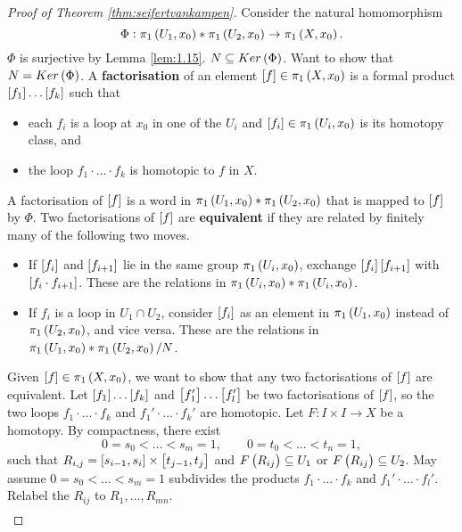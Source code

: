 \begin{proof}[Proof of Theorem \ref{thm:seifertvankampen}]
Consider the natural homomorphism
$$ \Phi : \pi_1\br{U_1, x_0} * \pi_1\br{U_2, x_0} \to \pi_1\br{X, x_0}. $$
$ \Phi $ is surjective by Lemma \ref{lem:1.15}. $ N \subseteq Ker\br{\Phi} $. Want to show that $ N = Ker\br{\Phi} $. A \textbf{factorisation} of an element $ \sbr{f} \in \pi_1\br{X, x_0} $ is a formal product $ \sbr{f_1} \dots \sbr{f_k} $ such that
\begin{itemize}
\item each $ f_i $ is a loop at $ x_0 $ in one of the $ U_i $ and $ \sbr{f_i} \in \pi_1\br{U_i, x_0} $ is its homotopy class, and
\item the loop $ f_1 \cdot \dots \cdot f_k $ is homotopic to $ f $ in $ X $.
\end{itemize}
A factorisation of $ \sbr{f} $ is a word in $ \pi_1\br{U_1, x_0} * \pi_1\br{U_2, x_0} $ that is mapped to $ \sbr{f} $ by $ \Phi $. Two factorisations of $ \sbr{f} $ are \textbf{equivalent} if they are related by finitely many of the following two moves.
\begin{itemize}
\item If $ \sbr{f_i} $ and $ \sbr{f_{i + 1}} $ lie in the same group $ \pi_1\br{U_i, x_0} $, exchange $ \sbr{f_i}\sbr{f_{i + 1}} $ with $ \sbr{f_i \cdot f_{i + 1}} $. These are the relations in $ \pi_1\br{U_i, x_0} * \pi_1\br{U_i, x_0} $.
\item If $ f_i $ is a loop in $ U_1 \cap U_2 $, consider $ \sbr{f_i} $ as an element in $ \pi_1\br{U_1, x_0} $ instead of $ \pi_1\br{U_2, x_0} $, and vice versa. These are the relations in $ \pi_1\br{U_1, x_0} * \pi_1\br{U_2, x_0} / N $.
\end{itemize}
Given $ \sbr{f} \in \pi_1\br{X, x_0} $, we want to show that any two factorisations of $ \sbr{f} $ are equivalent. Let $ \sbr{f_1} \dots \sbr{f_k} $ and $ \sbr{f_1'} \dots \sbr{f_l'} $ be two factorisations of $ \sbr{f} $, so the two loops $ f_1 \cdot \dots \cdot f_k $ and $ f_1' \cdot \dots \cdot f_k' $ are homotopic. Let $ F : I \times I \to X $ be a homotopy. By compactness, there exist
$$ 0 = s_0 < \dots < s_m = 1, \qquad 0 = t_0 < \dots < t_n = 1, $$
such that $ R_{i, j} = \sbr{s_{i - 1}, s_i} \times \sbr{t_{j - 1}, t_j} $ and $ F\br{R_{ij}} \subseteq U_1 $ or $ F\br{R_{ij}} \subseteq U_2 $. May assume $ 0 = s_0 < \dots < s_m = 1 $ subdivides the products $ f_1 \cdot \dots \cdot f_k $ and $ f_1' \cdot \dots \cdot f_l' $. Relabel the $ R_{ij} $ to $ R_1, \dots, R_{mn} $.
$$
\begin{array}{|c|c|c|}

\end{array}$$
\end{proof}
